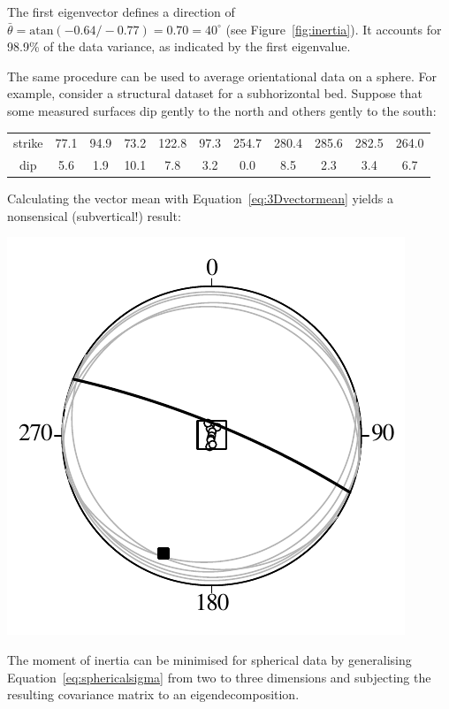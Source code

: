 The first eigenvector defines a direction of $\bar{\theta} =
\mbox{atan}(-0.64/-0.77) = 0.70 = 40^\circ$ (see
Figure~\ref{fig:inertia}). It accounts for 98.9\% of the data
variance, as indicated by the first eigenvalue.\medskip

The same procedure can be used to average orientational data on a
sphere. For example, consider a structural dataset for a subhorizontal
bed. Suppose that some measured surfaces dip gently to the north and
others gently to the south:

\begin{center}
  \begin{tabular}{c|cccccccccc}
    strike & 77.1 & 94.9 & 73.2 & 122.8 & 97.3 &
    254.7 & 280.4 & 285.6 & 282.5 & 264.0 \\
    dip & 5.6 & 1.9 & 10.1 & 7.8 & 3.2 & 0.0 & 8.5 & 2.3 & 3.4 & 6.7
\end{tabular}
\end{center}

Calculating the vector mean with Equation~\ref{eq:3Dvectormean} yields
a nonsensical (subvertical!) result:\medskip

\noindent\begin{minipage}[t][][b]{.35\textwidth}
\includegraphics[width=\textwidth]{../figures/subhorizontal.pdf}
\end{minipage}
\begin{minipage}[t][][t]{.65\textwidth}
  \label{fig:subhorizontal}
\end{minipage}

The moment of inertia can be minimised for spherical data by
generalising Equation~\ref{eq:sphericalsigma} from two to three
dimensions and subjecting the resulting covariance matrix to an
eigendecomposition.
